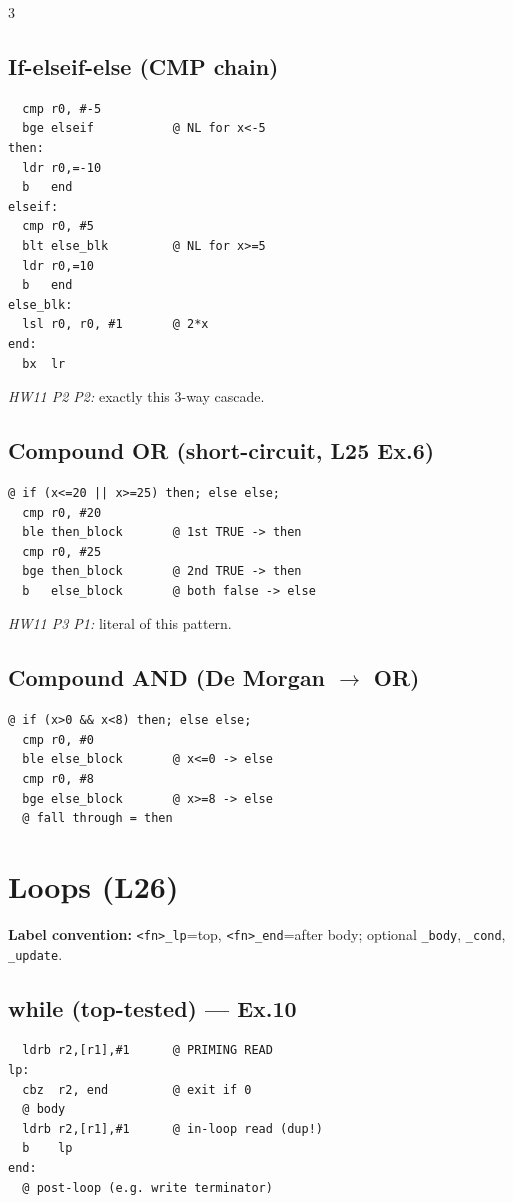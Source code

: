 \documentclass[8pt,landscape]{extarticle}
\begin{document}
\begin{multicols*}{3}
\subsection{If-elseif-else (CMP chain)}
\begin{lstlisting}
  cmp r0, #-5
  bge elseif           @ NL for x<-5
then:
  ldr r0,=-10
  b   end
elseif:
  cmp r0, #5
  blt else_blk         @ NL for x>=5
  ldr r0,=10
  b   end
else_blk:
  lsl r0, r0, #1       @ 2*x
end:
  bx  lr
\end{lstlisting}
\textit{HW11 P2 P2:} exactly this 3-way cascade.

\subsection{Compound OR (short-circuit, L25 Ex.6)}
\begin{lstlisting}
@ if (x<=20 || x>=25) then; else else;
  cmp r0, #20
  ble then_block       @ 1st TRUE -> then
  cmp r0, #25
  bge then_block       @ 2nd TRUE -> then
  b   else_block       @ both false -> else
\end{lstlisting}
\textit{HW11 P3 P1:} literal of this pattern.

\subsection{Compound AND (De Morgan $\to$ OR)}
\begin{lstlisting}
@ if (x>0 && x<8) then; else else;
  cmp r0, #0
  ble else_block       @ x<=0 -> else
  cmp r0, #8
  bge else_block       @ x>=8 -> else
  @ fall through = then
\end{lstlisting}

\section{Loops (L26)}

\textbf{Label convention:} \texttt{<fn>\_lp}=top, \texttt{<fn>\_end}=after body; optional \texttt{\_body}, \texttt{\_cond}, \texttt{\_update}.

\subsection{while (top-tested) --- Ex.10}
\begin{lstlisting}
  ldrb r2,[r1],#1      @ PRIMING READ
lp:
  cbz  r2, end         @ exit if 0
  @ body
  ldrb r2,[r1],#1      @ in-loop read (dup!)
  b    lp
end:
  @ post-loop (e.g. write terminator)
\end{lstlisting}


\end{multicols*}
\end{document}
